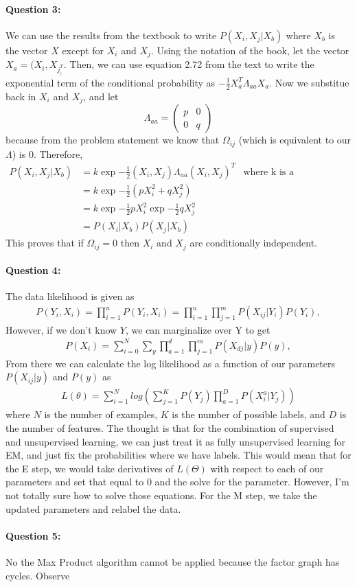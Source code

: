 \documentclass[letterpaper,11pt]{article}
\begin{document}
\paragraph{Question 3:}
    We can use the results from the textbook to write $P(X_i, X_j | X_b)$ where $X_b$ is the vector
    $X$ except for $X_i$ and $X_j$. Using the notation of the book, let the vector $X_a = (X_i, X_j_)^T$.
    Then, we can use equation 2.72 from the text to write the exponential term of the conditional probability
    as $-\frac{1}{2} X_a^T \Lambda_{aa} X_a$. Now we substitue back in $X_i$ and $X_j$, and let
    \begin{equation}
        \Lambda_{aa} = \left( \begin{array}{ccc}
            p & 0 \\
            0 & q \end{array} \right)
    \end{equation}
    because from the problem statement we know that $\Omega_{ij}$ (which is equivalent to our $\Lambda$) is 0.
    Therefore,
    \begin{align}
        P(X_i, X_j | X_b) & = k \exp{-\frac{1}{2} (X_i, X_j) \Lambda_{aa} (X_i, X_j)^T} & \text{where k is a normalization constant}\\
                          & = k \exp{-\frac{1}{2} (p X_i^2 + q X_j^2) }\\
                          & = k \exp{-\frac{1}{2} p X_i^2} \exp{-\frac{1}{2} q X_j^2 }\\
                          & = P(X_i | X_b) P(X_j | X_b)
    \end{align}
    This proves that if $\Omega_{ij} = 0$ then $X_i$ and $X_j$ are conditionally independent.

\paragraph{Question 4:}
The data likelihood is given as
\begin{align}
P(Y_i,X_i) = \prod_{i=1}^n P(Y_i,X_i) = \prod_{i=1}^n \prod_{j=1}^m P(X_{ij}|Y_i)P(Y_i),
\end{align}
However, if we don't know $Y$, we can marginalize over Y to get
\begin{align}
    P(X_i) = \sum_{i = 0}^N \sum_{y} \prod_{a=1}^d \prod_{j=1}^m P(X_{dj}|y)P(y),
\end{align}
From there we can calculate the log likelihood as a function of our parameters $P(X_{ij} | y)$ and
$P(y)$ as
\begin{align}
    L(\theta) = \sum_{i=1}^N log \left( \sum_{j=1}^K P(Y_j) \prod_{a=1}^D P(X_i^a | Y_j) \right)
\end{align}
where $N$ is the number of examples, $K$ is the number of possible labels, and $D$ is the number
of features. The thought is that for the combination of supervised and unsupervised learning,
we can just treat it as fully unsupervised learning for EM, and just fix the probabilities
where we have labels. This would mean that for the E step, we would take derivatives of $L(\Theta)$
with respect to each of our parameters and set that equal to $0$ and the solve for the parameter.
However, I'm not totally sure how to solve those equations. For the M step, we take the updated parameters
and relabel the data.
\paragraph{Question 5:}
No the Max Product algorithm cannot be applied because the factor graph has cycles. Observe
\end{document}

